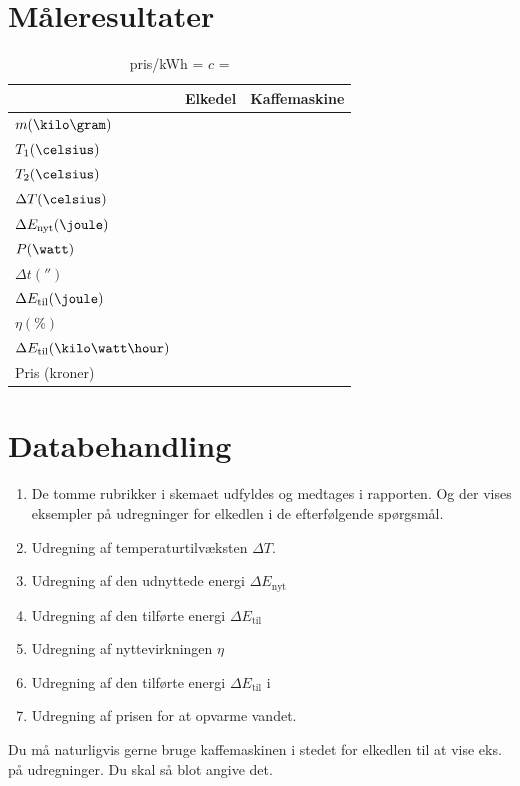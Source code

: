 \section{Måleresultater}
\begin{table}
\centering
\caption[Data registreringsskema]{pris/kWh = \hspace{5cm} $c$ =}
\label{tbl:data.forsøg1}
\begin{tabular}{ @{ } p{3cm}  p{3cm}  p{3cm} @{ } }
	\toprule[2pt]
			&	Elkedel	&	Kaffemaskine	\\
	\midrule[1.2pt]
	$m (\kilo\gram)$					&			&				\\
	$T_{1} (\celsius)$					&			&				\\
	$T_{2} (\celsius)$					&			&				\\
	$\Delta T (\celsius)$					&			&				\\
	$\Delta E_{\mathrm{nyt}} (\joule)$		&			&				\\
	$P (\watt)$						&			&				\\
	$\Delta t (\second)$					&			&				\\
	$\Delta E_{\mathrm{til}} (\joule)$		&			&				\\
	$\eta (\%)$						&			&				\\
	$\Delta E_{\mathrm{til}} (\kilo\watt\hour)$	&			&				\\
	Pris (kroner)						&			&				\\
	\bottomrule[2pt]
\end{tabular}
\end{table}

\section{Databehandling}
\begin{enumerate}
	\item De tomme rubrikker i skemaet udfyldes og medtages i rapporten. Og der vises eksempler på udregninger for elkedlen i de efterfølgende spørgsmål.
	\item Udregning af temperaturtilvæksten $\Delta T$.
	\item Udregning af den udnyttede energi  $\Delta E_{\mathrm{nyt}}$
	\item Udregning af den tilførte energi $\Delta E_{\mathrm{til}}$
	\item Udregning af nyttevirkningen $\eta$
	\item Udregning af den tilførte energi $\Delta E_{\mathrm{til}}$ i \kilo\watt\hour
	\item Udregning af prisen for at opvarme vandet.
\end{enumerate}
Du må naturligvis gerne bruge kaffemaskinen i stedet for elkedlen til at vise eks. på udregninger. Du skal så blot angive det.

